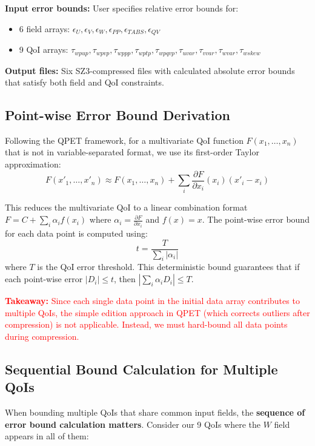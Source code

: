 \documentclass[11pt,a4paper]{article}
\begin{document}
\textbf{Input error bounds:} User specifies relative error bounds for:
\begin{itemize}
    \item 6 field arrays: $\epsilon_U, \epsilon_V, \epsilon_W, \epsilon_{PP}, \epsilon_{TABS}, \epsilon_{QV}$
    \item 9 QoI arrays: $\tau_{wpup}, \tau_{wpvp}, \tau_{wppp}, \tau_{wptp}, \tau_{wpqvp}, \tau_{uvar}, \tau_{vvar}, \tau_{wvar}, \tau_{wskew}$
\end{itemize}

\textbf{Output files:} Six SZ3-compressed files with calculated absolute error bounds that satisfy both field and QoI constraints.

\subsection{Point-wise Error Bound Derivation}

Following the QPET framework, for a multivariate QoI function $F(x_1, \ldots, x_n)$ that is not in variable-separated format, we use its first-order Taylor approximation:
\begin{equation}
    F(x'_1, \ldots, x'_n) \approx F(x_1, \ldots, x_n) + \sum_i \frac{\partial F}{\partial x_i}(x_i)(x'_i - x_i)
\end{equation}

This reduces the multivariate QoI to a linear combination format $F = C + \sum_i \alpha_i f(x_i)$ where $\alpha_i = \frac{\partial F}{\partial x_i}$ and $f(x) = x$. The point-wise error bound for each data point is computed using:
\begin{equation}
    t = \frac{T}{\sum_i |\alpha_i|}
\end{equation}
where $T$ is the QoI error threshold. This deterministic bound guarantees that if each point-wise error $|D_i| \leq t$, then $|\sum_i \alpha_i D_i| \leq T$.

\textcolor{red}{\textbf{Takeaway:} Since each single data point in the initial data array contributes to multiple QoIs, the simple edition approach in QPET (which corrects outliers after compression) is not applicable. Instead, we must hard-bound all data points during compression.}

\subsection{Sequential Bound Calculation for Multiple QoIs}

When bounding multiple QoIs that share common input fields, the \textbf{sequence of error bound calculation matters}. Consider our 9 QoIs where the $W$ field appears in all of them:
\end{document}
